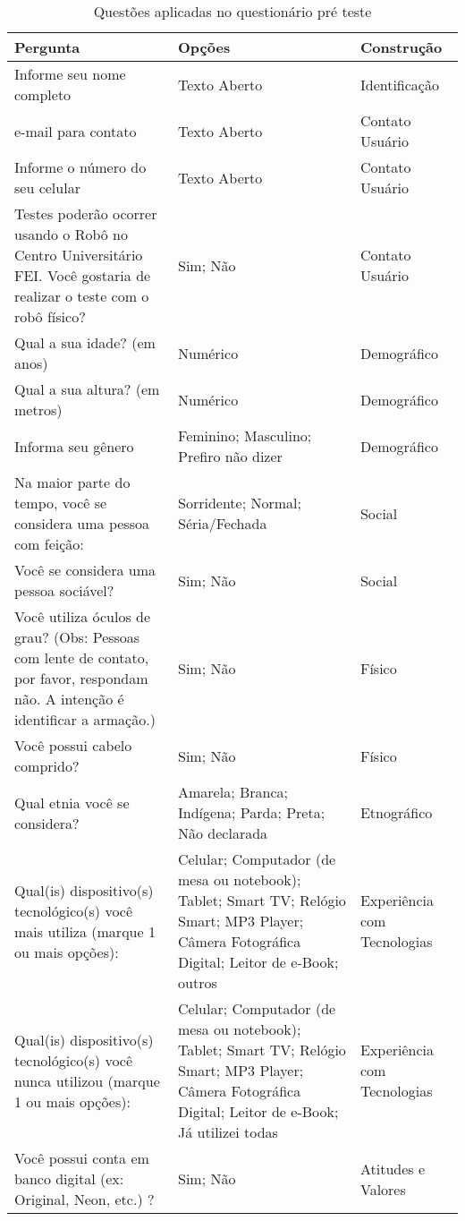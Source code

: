\begin{longtable}{ m{7 cm} | m{4cm} | m{4cm} }
	\caption{Questões aplicadas no questionário pré teste }
	\label{tab:questoespreteste} \\	\hline
	Pergunta & Opções & Construção \\ \hline
	Informe seu nome completo & Texto Aberto & Identificação \\ \hline
	e-mail para contato & Texto Aberto & Contato Usuário \\ \hline
	Informe o número do seu celular & Texto Aberto & Contato Usuário \\ \hline
	Testes poderão ocorrer usando o Robô no Centro Universitário FEI. Você gostaria de realizar o teste com o robô físico? & Sim; Não & Contato Usuário \\ \hline
	Qual a sua idade? (em anos) & Numérico & Demográfico \\ \hline
	Qual a sua altura? (em metros) & Numérico & Demográfico \\ \hline
	Informa seu gênero & Feminino; Masculino; Prefiro não dizer & Demográfico \\ \hline
	Na maior parte do tempo, você se considera uma pessoa com feição: & Sorridente; Normal; Séria/Fechada & Social \\ \hline
	Você se considera uma pessoa sociável? & Sim; Não & Social \\ \hline
	Você utiliza óculos de grau? (Obs: Pessoas com lente de contato, por favor, respondam não. A intenção é identificar a armação.) & Sim; Não & Físico \\ \hline
	Você possui cabelo comprido? & Sim; Não & Físico \\ \hline
	Qual etnia você se considera? & Amarela; Branca; Indígena; Parda; Preta; Não declarada & Etnográfico \\ \hline
	Qual(is) dispositivo(s) tecnológico(s) você mais utiliza (marque 1 ou mais opções): & Celular; Computador (de mesa ou notebook); Tablet; Smart TV; Relógio Smart; MP3 Player; Câmera Fotográfica Digital; Leitor de e-Book; outros & Experiência com Tecnologias \\ \hline
	Qual(is) dispositivo(s) tecnológico(s) você nunca utilizou (marque 1 ou mais opções): & Celular; Computador (de mesa ou notebook); Tablet; Smart TV; Relógio Smart; MP3 Player; Câmera Fotográfica Digital; Leitor de e-Book; Já utilizei todas & Experiência com Tecnologias \\ \hline
	Você possui conta em banco digital (ex: Original, Neon, etc.) ? & Sim; Não & Atitudes e Valores \\ \hline

\end{longtable}
